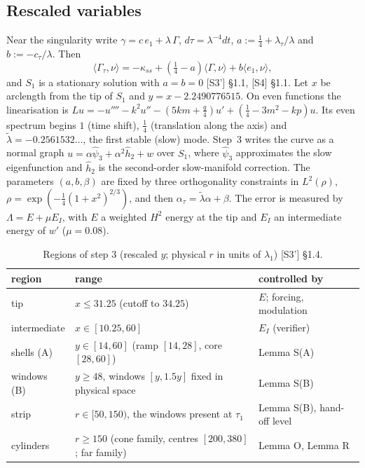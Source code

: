 \documentclass[11pt]{amsart}
\theoremstyle{definition}
\theoremstyle{remark}
\newcommand{\ip}[2]{\langle #1,#2\rangle}
\newcommand{\Lam}{\Lambda}
\newcommand{\dref}[1]{[\textsf{#1}]}
\begin{document}
\subsection{Rescaled variables}
Near the singularity write $\gamma=c\,e_1+\lambda\,\Gamma$, $d\tau=\lambda^{-4}dt$, $a:=\frac14+\lambda_\tau/\lambda$ and $b:=-c_\tau/\lambda$. Then
\begin{equation}\label{eq:resc}
\ip{\Gamma_\tau}\nu=-\kappa_{ss}+(\tfrac14-a)\ip\Gamma\nu+b\ip{e_1}\nu,
\end{equation}
and $S_1$ is a stationary solution with $a=b=0$ \dref{S3'} \S1.1, \dref{S4} \S1.1. Let $x$ be arclength from the tip of $S_1$ and $y=x-2.2490776515$. On even functions the linearisation is $Lu=-u''''-k^2u''-(5km+\frac q4)u'+(\frac14-3m^2-kp)u$. Its even spectrum begins $1$ (time shift), $\frac14$ (translation along the axis) and $\tilde\lambda=-0.2561532\ldots$, the first stable (slow) mode. Step~3 writes the curve as a normal graph $u=\alpha\hat\psi_3+\alpha^2\hat h_2+w$ over $S_1$, where $\hat\psi_3$ approximates the slow eigenfunction and $\hat h_2$ is the second-order slow-manifold correction. The parameters $(a,b,\beta)$ are fixed by three orthogonality constraints in $L^2(\rho)$, $\rho=\exp(-\frac14(1+x^2)^{2/3})$, and then $\alpha_\tau=\tilde\lambda\alpha+\beta$. The error is measured by $\Lam=E+\mu E_I$, with $E$ a weighted $H^2$ energy at the tip and $E_I$ an intermediate energy of $w'$ ($\mu=0.08$).

\begin{table}[htbp]\centering\small
\caption{Regions of step 3 (rescaled $y$; physical $r$ in units of $\lambda_1$) \dref{S3'} \S1.4.}\label{tab:regions}
\begin{tabular}{@{}lll@{}}\toprule
region & range & controlled by\\\midrule
tip & $x\le31.25$ (cutoff to $34.25$) & $E$; forcing, modulation\\
intermediate & $x\in[10.25,60]$ & $E_I$ (verifier)\\
shells (A) & $y\in[14,60]$ (ramp $[14,28]$, core $[28,60]$) & Lemma S(A)\\
windows (B) & $y\ge48$, windows $[y,1.5y]$ fixed in physical space & Lemma S(B) \\
strip & $r\in[50,150)$, the windows present at $\tau_1$ & Lemma S(B), hand-off level\\
cylinders & $r\ge150$ (cone family, centres $[200,380]$; far family) & Lemma O, Lemma R\\\bottomrule
\end{tabular}\end{table}
\end{document}
